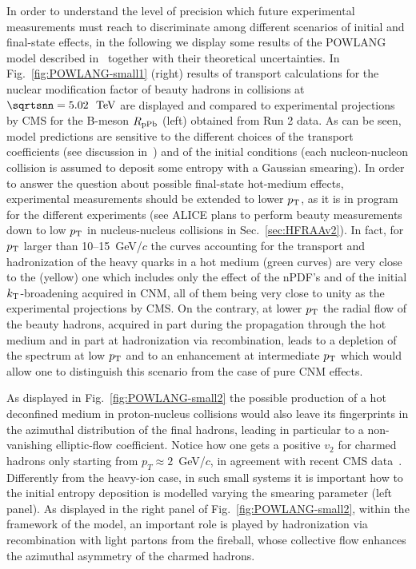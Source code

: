 In order to understand the level of precision which future experimental measurements must reach to discriminate among different scenarios of initial and final-state effects, in the following we display some results of the POWLANG model described in~\cite{Beraudo:2015wsd} together with their theoretical uncertainties.
In Fig.~\ref{fig:POWLANG-small1} (right) results of transport calculations for the nuclear modification factor of beauty hadrons in \pPb collisions at $\sqrtsnn=5.02~\UTeV$  are displayed and compared to experimental projections by CMS for the B-meson $R_{\rm pPb}$ (left) obtained from Run 2 data. As can be seen, model predictions are sensitive to the different choices of the transport coefficients (see discussion in~\cite{Beraudo:2015wsd}) and of the initial conditions (each nucleon-nucleon collision is assumed to deposit some entropy with a Gaussian smearing). In order to answer the question about possible final-state hot-medium effects, experimental measurements should be extended to lower $p\sb{\scriptstyle\mathrm{T}}$, as it is in program for the different experiments (see ALICE plans to perform beauty measurements down to low $p\sb{\scriptstyle\mathrm{T}}$ in nucleus-nucleus collisions in Sec.~\ref{sec:HFRAAv2}). In fact, for $p\sb{\scriptstyle\mathrm{T}}$ larger than 10--15~GeV/$c$ the curves accounting for the transport and hadronization of the heavy quarks in a hot medium (green curves) are very close to the (yellow) one which includes only the effect of the nPDF's and of the initial $k_{\rm T}$-broadening acquired in CNM, all of them being very close to unity as the experimental projections by CMS. On the contrary, at lower $p\sb{\scriptstyle\mathrm{T}}$ the radial flow of the beauty hadrons, acquired in part during the propagation through the hot medium and in part at hadronization via recombination, leads to a depletion of the spectrum at low $p\sb{\scriptstyle\mathrm{T}}$ and to an enhancement at intermediate $p\sb{\scriptstyle\mathrm{T}}$ which would allow one to distinguish this scenario from the case of pure CNM effects. 

As displayed in Fig.~\ref{fig:POWLANG-small2} the possible production of a hot deconfined medium in proton-nucleus collisions would also leave its fingerprints in the azimuthal distribution of the final hadrons, leading in particular to a non-vanishing elliptic-flow coefficient. Notice how one gets a positive $v_2$ for charmed hadrons only starting from $p_T\!\approx\!2$~GeV/$c$, in agreement with recent CMS data~\cite{Sirunyan:2018toe}. Differently from the heavy-ion case, in such small systems it is important how to the initial entropy deposition is modelled varying the smearing parameter (left panel). As displayed in the right panel of Fig.~\ref{fig:POWLANG-small2}, within the framework of the model, an important role is played by hadronization via recombination with light partons from the fireball, whose collective flow enhances the azimuthal asymmetry of the charmed hadrons.

